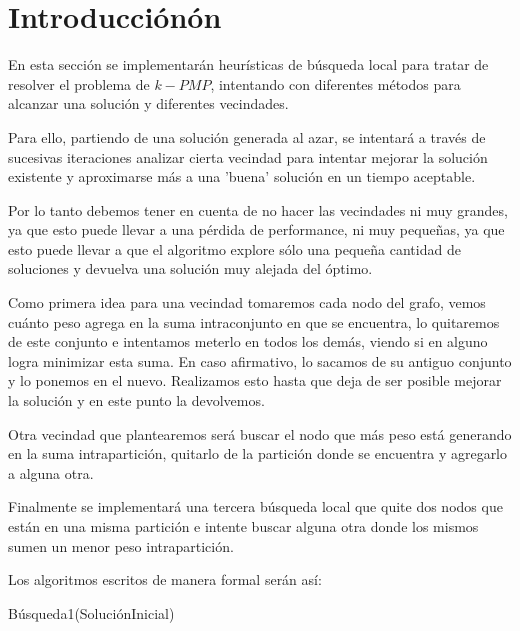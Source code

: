 \section{Introducción\'on}

En esta sección se implementarán heurísticas de búsqueda local para tratar de resolver el problema de $k-PMP$, intentando con diferentes métodos para alcanzar una solución y diferentes vecindades.

Para ello, partiendo de una solución generada al azar, se intentará a través de sucesivas iteraciones analizar cierta vecindad para intentar mejorar la solución existente y aproximarse más a una 'buena' solución en un tiempo aceptable. 

Por lo tanto debemos tener en cuenta de no hacer las vecindades ni muy grandes, ya que esto puede llevar a una pérdida de performance, ni muy pequeñas, ya que esto puede llevar a que el algoritmo explore sólo una pequeña cantidad de soluciones y devuelva una solución muy alejada del óptimo.

Como primera idea para una vecindad tomaremos cada nodo del grafo, vemos cuánto peso agrega en la suma intraconjunto en que se encuentra, lo quitaremos de este conjunto e intentamos meterlo en todos los demás, viendo si en alguno logra minimizar esta suma. En caso afirmativo, lo sacamos de su antiguo conjunto y lo ponemos en el nuevo. Realizamos esto hasta que deja de ser posible mejorar la solución y en este punto la devolvemos.


Otra vecindad que plantearemos será buscar el nodo que más peso está generando en la suma intrapartición, quitarlo de la partición donde se encuentra y agregarlo a alguna otra.

Finalmente se implementará una tercera búsqueda local que quite dos nodos que están en una misma partición e intente buscar alguna otra donde los mismos sumen un menor peso intrapartición.

Los algoritmos escritos de manera formal serán así:

\begin{algorithm}
  	\begin{algorithmic}[1]\parskip=1mm
		 \caption{ Búsqueda1(SoluciónInicial) }
	\end{algorithmic}
\end{algorithm}

